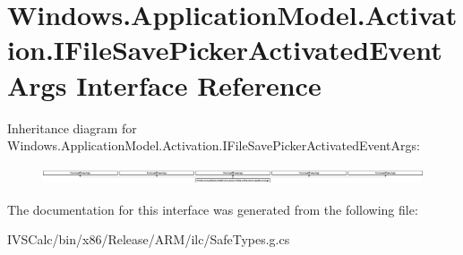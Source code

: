 \hypertarget{interface_windows_1_1_application_model_1_1_activation_1_1_i_file_save_picker_activated_event_args}{}\section{Windows.\+Application\+Model.\+Activation.\+I\+File\+Save\+Picker\+Activated\+Event\+Args Interface Reference}
\label{interface_windows_1_1_application_model_1_1_activation_1_1_i_file_save_picker_activated_event_args}
Inheritance diagram for Windows.\+Application\+Model.\+Activation.\+I\+File\+Save\+Picker\+Activated\+Event\+Args\+:\begin{figure}[H]
\begin{center}
\leavevmode
\includegraphics[height=0.512586cm]{interface_windows_1_1_application_model_1_1_activation_1_1_i_file_save_picker_activated_event_args}
\end{center}
\end{figure}


The documentation for this interface was generated from the following file\+:\begin{DoxyCompactItemize}
\item 
I\+V\+S\+Calc/bin/x86/\+Release/\+A\+R\+M/ilc/Safe\+Types.\+g.\+cs\end{DoxyCompactItemize}

